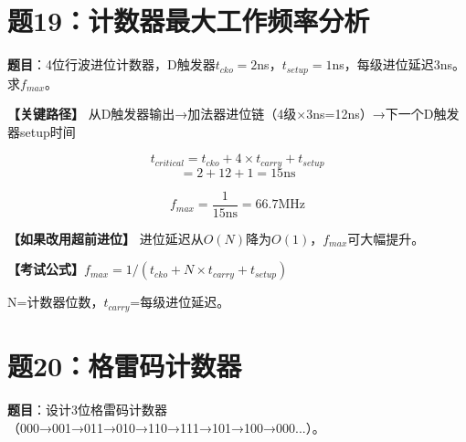 \section{题19：计数器最大工作频率分析}

\textbf{题目}：4位行波进位计数器，D触发器$t_{cko}=2$ns，$t_{setup}=1$ns，每级进位延迟3ns。求$f_{max}$。

\begin{solution}[完整解答]

\textbf{【关键路径】}
从D触发器输出→加法器进位链（4级×3ns=12ns）→下一个D触发器setup时间

$$t_{critical} = t_{cko} + 4 \times t_{carry} + t_{setup}$$
$$= 2 + 12 + 1 = 15\text{ns}$$

$$f_{max} = \frac{1}{15\text{ns}} = 66.7\text{MHz}$$

\textbf{【如果改用超前进位】}
进位延迟从$O(N)$降为$O(1)$，$f_{max}$可大幅提升。

\textbf{【考试公式】}$f_{max} = 1 / (t_{cko} + N \times t_{carry} + t_{setup})$

N=计数器位数，$t_{carry}$=每级进位延迟。

\end{solution}


\section{题20：格雷码计数器}

\textbf{题目}：设计3位格雷码计数器（000→001→011→010→110→111→101→100→000...）。

